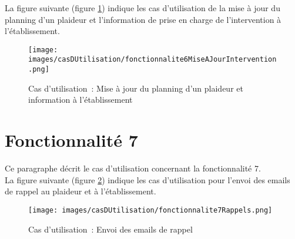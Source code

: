 La figure suivante (figure \ref{diagrammeCasUtilisation6}) indique les cas d'utilisation de la mise à jour du planning d'un plaideur et l'information de prise en charge de l'intervention à l'établissement.
\begin{figure}[H]
	\centering
	\texttt{[image: images/casDUtilisation/fonctionnalite6MiseAJourIntervention.png]}
	\caption{Cas d'utilisation~: Mise à jour du planning d'un plaideur et information à l'établissement}
	\label{diagrammeCasUtilisation6}
\end{figure}




\section{Fonctionnalité 7}
Ce paragraphe décrit le cas d'utilisation concernant la fonctionnalité 7.\\

La figure suivante (figure \ref{diagrammeCasUtilisation7}) indique les cas d'utilisation pour l'envoi des emails de rappel au plaideur et à l'établissement.
\begin{figure}[H]
	\centering
	\texttt{[image: images/casDUtilisation/fonctionnalite7Rappels.png]}
	\caption{Cas d'utilisation~: Envoi des emails de rappel}
	\label{diagrammeCasUtilisation7}
\end{figure}